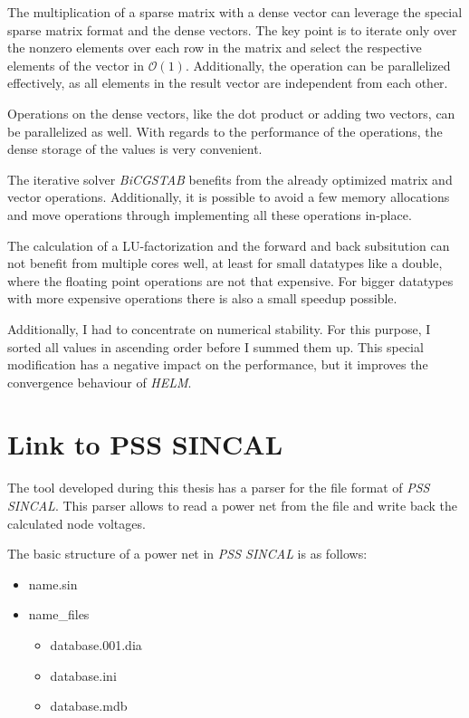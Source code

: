 The multiplication of a sparse matrix with a dense vector can leverage the special sparse matrix format and the dense vectors. The key point is to iterate only over the nonzero elements over each row in the matrix and select the respective elements of the vector in $\mathcal O(1)$. Additionally, the operation can be parallelized effectively, as all elements in the result vector are independent from each other.

Operations on the dense vectors, like the dot product or adding two vectors, can be parallelized as well. With regards to the performance of the operations, the dense storage of the values is very convenient.

The iterative solver \emph{BiCGSTAB} benefits from the already optimized matrix and vector operations. Additionally, it is possible to avoid a few memory allocations and move operations through implementing all these operations in-place.

The calculation of a LU-factorization and the forward and back subsitution can not benefit from multiple cores well, at least for small datatypes like a double, where the floating point operations are not that expensive. For bigger datatypes with more expensive operations there is also a small speedup possible.

Additionally, I had to concentrate on numerical stability. For this purpose, I sorted all values in ascending order before I summed them up. This special modification has a negative impact on the performance, but it improves the convergence behaviour of \emph{HELM}.

\section{Link to PSS SINCAL}
\label{sec:link_sincal}
The tool developed during this thesis has a parser for the file format of \emph{PSS SINCAL}. This parser allows to read a power net from the file and write back the calculated node voltages.

The basic structure of a power net in \emph{PSS SINCAL} is as follows:
\begin{itemize}
	\item {\textlangle}name{\textrangle}.sin
	\item {\textlangle}name{\textrangle\_}files
	\begin{itemize}
		\item database.001.dia
		\item database.ini
		\item database.mdb
	\end{itemize}
\end{itemize}

